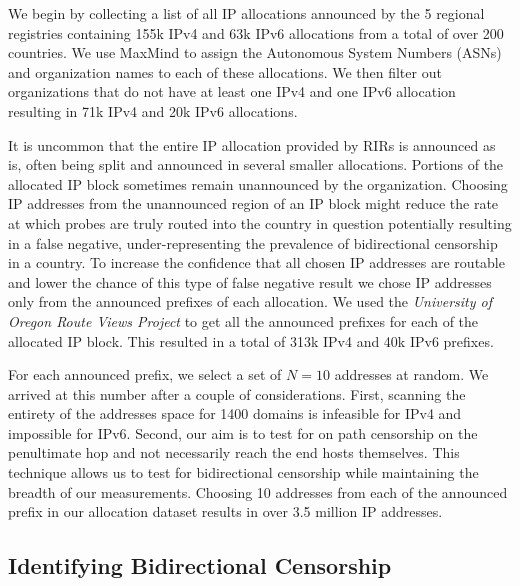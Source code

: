 We begin by collecting a list of all IP allocations announced by the 5 regional
registries \cite{herrbisc56:online} containing 155k IPv4 and
63k IPv6 allocations from a total of over 200 countries. We use
MaxMind \cite{IPGeoloc87:online} to assign the Autonomous System Numbers (ASNs)
and organization names to each of these allocations. We then filter out
organizations that do not have at least one IPv4 and one IPv6 allocation
resulting in 71k IPv4 and 20k IPv6 allocations.

It is uncommon that the entire IP allocation provided by RIRs is announced as
is, often being split and announced in several smaller allocations. Portions of
the allocated IP block sometimes remain unannounced by the organization.
Choosing IP addresses from the unannounced region of an IP block might reduce
the rate at which probes are truly routed into the country in question
potentially resulting in a false negative, under-representing the prevalence of
bidirectional censorship in a country. To increase the confidence that all
chosen IP addresses are routable and lower the chance of this type of false
negative result we chose IP addresses only from the announced prefixes of each
allocation. We used the \textit{University of Oregon Route Views Project}
\cite{RouteVie20:online} to get all the announced prefixes for each of the
allocated IP block. This resulted in a total of 313k IPv4 and 40k IPv6 prefixes.

For each announced prefix, we select a set of $N=10$ addresses at random. We
arrived at this number after a couple of considerations. First, scanning the
entirety of the addresses space for 1400 domains is infeasible for IPv4 and
impossible for IPv6. Second, our aim is to test for on path censorship on the
penultimate hop and not necessarily reach the end hosts themselves. This
technique allows us to test for bidirectional censorship while maintaining the
breadth of our measurements. Choosing 10 addresses from each of the announced
prefix in our allocation dataset results in over 3.5 million IP addresses.

\FigAllocSize

\subsection{Identifying Bidirectional Censorship}
\label{sec:methodology:censorship}

